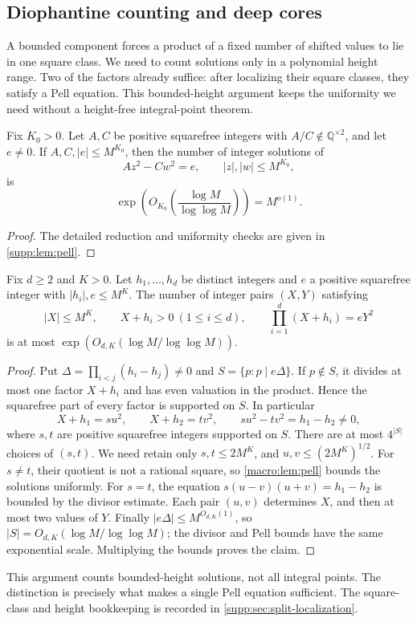 \subsection{Diophantine counting and deep cores}
A bounded component forces a product of a fixed number of shifted values
to lie in one square class. We need to count solutions only in a polynomial
height range. Two of the factors already suffice: after localizing their
square classes, they satisfy a Pell equation. This bounded-height argument
keeps the uniformity we need without a height-free integral-point theorem.
\begin{lemma}\label{macro:lem:pell}
Fix $K_0>0$.  Let $A,C$ be positive squarefree integers with
$A/C\notin\mathbb Q^{\times2}$, and let $e\neq0$.  If
$A,C,|e|\leq M^{K_0}$, then the number of integer solutions of
\[
 Az^2-Cw^2=e,
 \qquad |z|,|w|\leq M^{K_0},
\]
is
\[
 \exp\!\left(O_{K_0}\!\left(\frac{\log M}{\log\log M}\right)\right)
 =M^{o(1)}.
\]
\end{lemma}

\begin{proof}The detailed reduction and uniformity checks are given in \cref{supp:lem:pell}.\end{proof}
\begin{lemma}\label{lem:split-bounded}
Fix $d\ge2$ and $K>0$. Let $h_1,\ldots,h_d$ be distinct integers and
$e$ a positive squarefree integer with $|h_i|,e\le M^K$.
The number of integer pairs $(X,Y)$ satisfying
\[
 |X|\le M^K,\qquad X+h_i>0\ (1\le i\le d),\qquad
              \prod_{i=1}^d(X+h_i)=eY^2
\]
is at most $\exp(O_{d,K}(\log M/\log\log M))$.
\end{lemma}
\begin{proof}
Put $\Delta=\prod_{i<j}(h_i-h_j)\ne0$ and
$S=\{p:p\mid e\Delta\}$. If $p\notin S$, it divides at most one
factor $X+h_i$ and has even valuation in the product. Hence the
squarefree part of every factor is supported on $S$.
In particular
\[
 X+h_1=su^2,\qquad X+h_2=tv^2,
 \qquad su^2-tv^2=h_1-h_2\ne0,
\]
where $s,t$ are positive squarefree integers supported on $S$.
There are at most $4^{|S|}$ choices of $(s,t)$. We need retain only
$s,t\le2M^K$, and $u,v\le(2M^K)^{1/2}$.
For $s\ne t$, their quotient is not a rational square, so
\cref{macro:lem:pell} bounds the solutions uniformly. For $s=t$,
the equation $s(u-v)(u+v)=h_1-h_2$ is bounded by the divisor estimate.
Each pair $(u,v)$ determines $X$, and then at most two values of $Y$.
Finally $|e\Delta|\le M^{O_{d,K}(1)}$, so
$|S|=O_{d,K}(\log M/\log\log M)$; the divisor and Pell bounds have the
same exponential scale. Multiplying the bounds proves the claim.
\end{proof}
This argument counts bounded-height solutions, not all integral points.
The distinction is precisely what makes a single Pell equation sufficient.
The square-class and height bookkeeping is recorded in
\cref{supp:sec:split-localization}.

